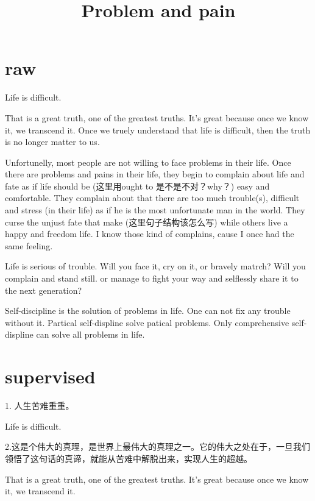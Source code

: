 \documentclass[UTF8]{article}
\title{Problem and pain}
\begin{document}
\maketitle

\section{raw}


Life is difficult. 

That is a great truth, one of the greatest truths. It's great because once we know it, we transcend it. 
Once we truely understand that life is difficult, then the truth is no longer matter to us.

Unfortunelly, most people are not willing to face problems in their life. Once there are problems and pains in their life, they begin to complain about life and fate as if life should be (这里用ought to 是不是不对？why？)  easy and comfortable. They complain about that there are too much trouble(s), difficult and stress (in their life) as if he is the most unfortunate man in the world. They curse the unjust fate that make (这里句子结构该怎么写) while others live a happy and freedom life. I know those kind of complains, cause I once had the same feeling.

Life is serious of trouble. Will you face it, cry on it, or bravely matrch? Will you complain and stand still. or manage to fight your way and selflessly share it to the  next generation?

Self-discipline is the solution of problems in life. One can not fix any trouble without it. Partical self-displine solve patical problems. Only comprehensive self-displine can solve all problems in life.

\section{supervised}
\setlength{\baselineskip}{2cm}

1. 人生苦难重重。

Life is difficult. 



2.这是个伟大的真理，是世界上最伟大的真理之一。它的伟大之处在于，一旦我们领悟了这句话的真谛，就能从苦难中解脱出来，实现人生的超越。

That is a great truth, one of the greatest truths. It's great because once we know it, we transcend it. 
\end{document}
